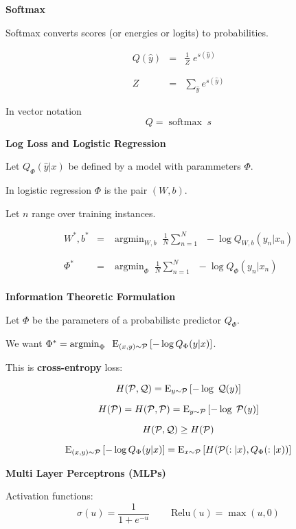\documentclass[landscape]{article}
\newcommand{\slide}[1]{
  \vfill
  \centerline{\Large\thepage}
  \eject
  \centerline{\bf #1}
  \vfill}
\DeclareMathOperator*{\argmin}{argmin}
\DeclareMathOperator*{\softmax}{softmax}
\newcommand{\expectsub}[2]{\mathrm{E}_{#1}\left[#2\right]}
\begin{document}
{\slide{Softmax}

Softmax converts scores (or energies or logits) to probabilities.

\vfill
\begin{eqnarray*}
  Q(\hat{y}) & = & \frac{1}{Z}\; e^{s(\hat{y})}
  \\
  \\
  \\
  Z & = & \sum_{\hat{y}} e^{s(\hat{y})}
\end{eqnarray*}

\vfill
In vector notation
\bigskip
$$Q  = \softmax\; s$$

\slide{Log Loss and Logistic Regression}
Let $Q_\Phi(\hat{y}|x)$ be defined by a model with parammeters $\Phi$.

\vfill
In logistic regression $\Phi$ is the pair $(W,b)$.

\vfill
Let $n$ range over training instances.

\begin{eqnarray*}
  W^*, b^* & = & \argmin_{W,b}\; \frac{1}{N} \sum_{n = 1}^N\;\;- \log Q_{W,b}(y_n|x_n) \\
  \\
  \\
  \Phi^* & = & \argmin_\Phi \;\frac{1}{N} \sum_{n = 1}^N\;\;- \log Q_\Phi(y_n|x_n) \\
\end{eqnarray*}


\slide{Information Theoretic Formulation}

Let $\Phi$ be the parameters of a probabilistc predictor $Q_\Phi$.

\vfill
\vfill
\centerline{We want \hspace{3ex} $\Phi^* = \argmin_\Phi \;\;\expectsub{(x,y) \sim {\cal P}}{ -\log Q_\Phi(y|x)}$.}

\vfill
\vfill
\vfill
This is {\bf cross-entropy} loss:

$$H({\cal P},{\cal Q}) = \expectsub{y \sim {\cal P}}{-\log\; {\cal Q}(y)}$$

$$H({\cal P}) = H({\cal P},{\cal P}) = \expectsub{y \sim {\cal P}}{-\log\; {\cal P}(y)}$$

$$H({\cal P},{\cal Q}) \geq H({\cal P})$$

$$\expectsub{(x,y) \sim {\cal P}}{ -\log Q_\Phi(y|x)} = \expectsub{x \sim {\cal P}}{H({\cal P}(:|x),Q_\Phi(:|x))}$$

\slide{Multi Layer Perceptrons (MLPs)}

Activation functions:
$$\sigma(u) = \frac{1}{1+e^{-u}}\;\;\;\;\;\;\;\;\mathrm{Relu}(u) = \max(u,0)$$

}
\end{document}
